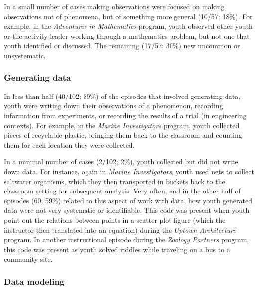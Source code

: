 \documentclass[]{msu-thesis}
\theoremstyle{definition}
\theoremstyle{definition}
\theoremstyle{definition}
\theoremstyle{remark}
\begin{document}
In a small number of cases making observations were focused on making
observations not of phenomena, but of something more general (10/57;
18\%). For example, in the \emph{Adventures in Mathematics} program,
youth observed other youth or the activity leader working through a
mathematics problem, but not one that youth identified or discussed. The
remaining (17/57; 30\%) new uncommon or unsystematic.

\subsubsection{Generating data}\label{generating-data}

In less than half (40/102; 39\%) of the episodes that involved
generating data, youth were writing down their observations of a
phenomenon, recording information from experiments, or recording the
results of a trial (in engineering contexts). For example, in the
\emph{Marine Investigators} program, youth collected pieces of
recyclable plastic, bringing them back to the classroom and counting
them for each location they were collected.

In a minimal number of cases (2/102; 2\%), youth collected but did not
write down data. For instance, again in \emph{Marine Investigators},
youth used nets to collect saltwater organisms, which they then
transported in buckets back to the classroom setting for subsequent
analysis. Very often, and in the other half of episodes (60; 59\%)
related to this aspect of work with data, how youth generated data were
not very systematic or identifiable. This code was present when youth
point out the relations between points in a scatter plot figure (which
the instructor then translated into an equation) during the \emph{Uptown
Architecture} program. In another instructional episode during the
\emph{Zoology Partners} program, this code was present as youth solved
riddles while traveling on a bus to a community site.

\subsubsection{Data modeling}\label{data-modeling}
\end{document}
